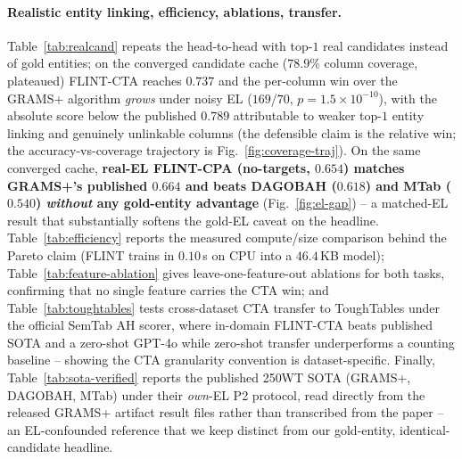 \documentclass[11pt]{article}
\begin{document}







\paragraph{Realistic entity linking, efficiency, ablations, transfer.}
Table~\ref{tab:realcand} repeats the head-to-head with top-$1$ real candidates instead
of gold entities; on the converged candidate cache ($78.9\%$ column coverage,
plateaued) FLINT-CTA reaches $0.737$ and the per-column win over the GRAMS+ algorithm
\emph{grows} under noisy EL ($169$/$70$, $p{=}1.5\times10^{-10}$), with the absolute
score below the published $0.789$ attributable to weaker top-$1$ entity linking and
genuinely unlinkable columns (the defensible claim is the relative win; the accuracy-vs-coverage
trajectory is Fig.~\ref{fig:coverage-traj}). On the same converged cache, \textbf{real-EL
FLINT-CPA (no-targets, $0.654$) matches GRAMS+'s published $0.664$ and beats DAGOBAH
($0.618$) and MTab ($0.540$) \emph{without} any gold-entity advantage}
(Fig.~\ref{fig:el-gap}) -- a matched-EL result that substantially softens the gold-EL
caveat on the headline. Table~\ref{tab:efficiency} reports the measured
compute/size comparison behind the Pareto claim (FLINT trains in $0.10$\,s on CPU into
a $46.4$\,KB model); Table~\ref{tab:feature-ablation} gives leave-one-feature-out
ablations for both tasks, confirming that no single feature carries the CTA win; and
Table~\ref{tab:toughtables} tests cross-dataset CTA transfer to ToughTables under the
official SemTab AH scorer, where in-domain FLINT-CTA beats published SOTA and a
zero-shot GPT-4o while zero-shot transfer underperforms a counting baseline -- showing
the CTA granularity convention is dataset-specific. Finally,
Table~\ref{tab:sota-verified} reports the published 250WT SOTA (GRAMS+, DAGOBAH, MTab)
under their \emph{own}-EL P2 protocol, read directly from the released GRAMS+ artifact
result files rather than transcribed from the paper -- an EL-confounded reference that
we keep distinct from our gold-entity, identical-candidate headline.







\end{document}
